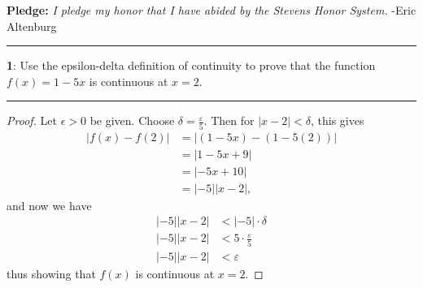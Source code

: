 \documentclass[11pt]{article}
\newcommand\question[2]{\vspace{.25in}\hrule\textbf{#1}: #2\vspace{.5em}\hrule\vspace{.10in}}
\begin{document}
\raggedright
\newcommand\NAME{Eric Altenburg}  %
\newcommand\COURSE{MA-240}
\newcommand\HWNUM{11}              %


\textbf{Pledge:} \textit{I pledge my honor that I have abided by the Stevens Honor System.} -Eric Altenburg

\question{1}{Use the epsilon-delta definition of continuity to prove that the function $f(x) = 1-5x$ is continuous at $x=2$.}

\begin{proof}
	Let $\epsilon > 0$ be given. Choose $\delta = \frac{\varepsilon}{5}$. Then for $|x-2| < \delta$, this gives 
	\begin{align*}
		|f(x)-f(2)| &= |(1-5x)-(1-5(2))|\\
		&= |1-5x + 9|\\
		&= |-5x+10|\\
		&= |-5||x-2|,
	\end{align*}
	and now we have
	\begin{align*}
		|-5||x-2| &< |-5| \cdot \delta\\
		|-5||x-2| &< 5 \cdot \frac{\varepsilon}{5}\\
		|-5||x-2| &< \varepsilon
	\end{align*}
	thus showing that $f(x)$ is continuous at $x=2$.
\end{proof}
\end{document}
